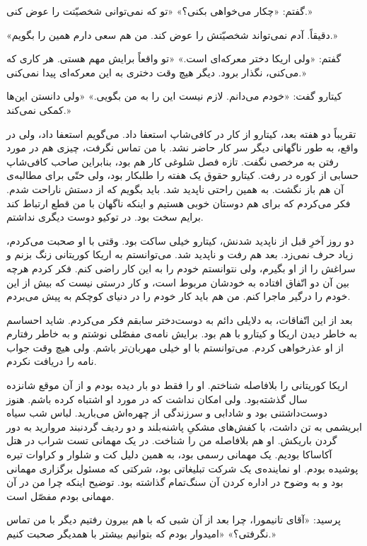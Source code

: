 \documentclass[a5paper]{book}
\begin{document}
گفتم: «چکار می‌خواهی بکنی؟» «تو که نمی‌توانی شخصیّتت را عوض کنی.»

«دقیقاً. آدم نمی‌تواند شخصیّتش را عوض کند. من هم سعی دارم همین را بگویم.»

گفتم: «ولی اریکا دختر معرکه‌ای است.» «تو واقعاً برایش مهم هستی. هر کاری که می‌کنی، نگذار برود. دیگر هیچ وقت دختری به این معرکه‌ای پیدا نمی‌کنی.»

کیتارو گفت: «خودم می‌دانم. لازم نیست این‌ را به من بگویی.» «ولی دانستن این‌ها کمکی نمی‌کند.»

تقریباً دو هفته بعد، کیتارو از کار در کافی‌شاپ استعفا داد. می‌گویم استعفا داد، ولی در واقع، به طور ناگهانی دیگر سر کار حاضر نشد. با من تماس نگرفت، چیزی هم در مورد رفتن به مرخصی نگفت. تازه فصل شلوغی کار هم بود، بنابراین صاحب کافی‌شاپ حسابی از کوره در رفت. کیتارو حقوق یک هفته را طلبکار بود، ولی حتّی برای مطالبه‌ی آن هم باز نگشت. به همین راحتی ناپدید شد. باید بگویم که از دستش ناراحت شدم. فکر می‌کردم که برای هم دوستان خوبی هستیم و اینکه ناگهان با من قطع ارتباط کند برایم سخت بود. در توکیو دوست دیگری نداشتم.

دو روز آخرِ قبل از ناپدید شدنش، کیتارو خیلی ساکت بود. وقتی با او صحبت می‌کردم، زیاد حرف نمی‌زد. بعد هم رفت و ناپدید شد. می‌توانستم به اریکا کوریتانی زنگ بزنم و سراغش را از او بگیرم، ولی نتوانستم خودم را به این کار راضی کنم. فکر کردم هرچه بین آن دو اتّفاق افتاده به خودشان مربوط است، و کار درستی نیست که بیش از این خودم را درگیر ماجرا کنم. من هم باید کار خودم را در دنیای کوچکم به پیش می‌بردم.

بعد از این اتّفاقات، به دلایلی دائم به دوست‌دختر سابقم فکر می‌کردم. شاید احساسم به خاطر دیدن اریکا و کیتارو با هم بود. برایش نامه‌ی مفصّلی نوشتم و به خاطر رفتارم از او عذرخواهی کردم. می‌توانستم با او خیلی مهربان‌تر باشم. ولی هیچ وقت جواب نامه را دریافت نکردم.

اریکا کوریتانی را بلافاصله شناختم. او را فقط دو بار دیده بودم و از آن موقع شانزده سال گذشته‌بود. ولی امکان نداشت که در مورد او اشتباه کرده باشم. هنوز دوست‌داشتنی بود و شادابی و سرزندگی از چهره‌اش می‌بارید. لباس شب سیاه ابریشمی به تن داشت، با کفش‌های مشکیِ پاشنه‌بلند و دو ردیف گردنبند مروارید به دور گردن باریکش. او هم بلافاصله من را شناخت.  در یک مهمانی تست شراب در هتل آکاساکا بودیم. یک مهمانی رسمی بود، به همین دلیل کت و شلوار و کراوات تیره پوشیده بودم. او نماینده‌ی یک شرکت تبلیغاتی بود، شرکتی که مسئول برگزاری مهمانی بود و به وضوح در اداره کردن آن سنگ‌تمام گذاشته بود. توضیح اینکه چرا من در آن مهمانی بودم مفصّل است.

پرسید: «آقای تانیمورا، چرا بعد از آن شبی که با هم بیرون رفتیم دیگر با من تماس نگرفتی؟» «امیدوار بودم که بتوانیم بیشتر با همدیگر صحبت کنیم.»
\end{document}
